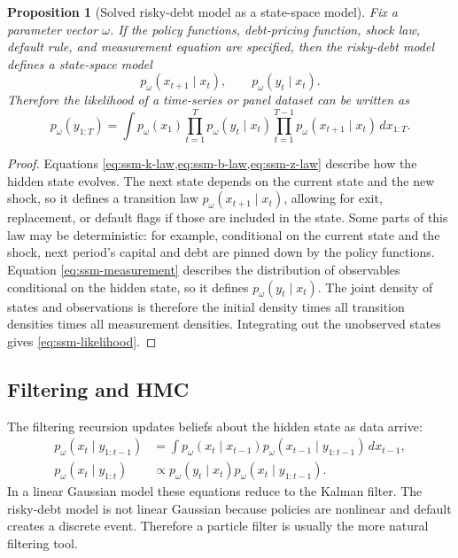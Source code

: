 \documentclass[11pt]{article}
\newtheorem{proposition}{Proposition}
\newcommand{\1}{\mathbf{1}}
\begin{document}
\begin{proposition}[Solved risky-debt model as a state-space model]
\label{prop:risky-debt-ssm}
Fix a parameter vector \(\omega\). If the policy functions, debt-pricing
function, shock law, default rule, and measurement equation are specified, then
the risky-debt model defines a state-space model
\[
  p_\omega(x_{t+1}\mid x_t),
  \qquad
  p_\omega(y_t\mid x_t).
\]
Therefore the likelihood of a time-series or panel dataset can be written as
\begin{equation}
  p_\omega(y_{1:T})
  =
  \int
  p_\omega(x_1)
  \prod_{t=1}^T
    p_\omega(y_t\mid x_t)
  \prod_{t=1}^{T-1}
    p_\omega(x_{t+1}\mid x_t)
  \,dx_{1:T}.
  \label{eq:ssm-likelihood}
\end{equation}
\end{proposition}

\begin{proof}
Equations \cref{eq:ssm-k-law,eq:ssm-b-law,eq:ssm-z-law} describe how the hidden
state evolves. The next state depends on the current state and the new shock,
so it defines a transition law \(p_\omega(x_{t+1}\mid x_t)\), allowing for
exit, replacement, or default flags if those are included in the state. Some
parts of this law may be deterministic: for example, conditional on the current
state and the shock, next period's capital and debt are pinned down by the
policy functions.
Equation \cref{eq:ssm-measurement} describes the distribution of observables
conditional on the hidden state, so it defines \(p_\omega(y_t\mid x_t)\). The
joint density of states and observations is therefore the initial density times
all transition densities times all measurement densities. Integrating out the
unobserved states gives \cref{eq:ssm-likelihood}.
\end{proof}

\subsection{Filtering and HMC}

The filtering recursion updates beliefs about the hidden state as data arrive:
\begin{align}
  p_\omega(x_t\mid y_{1:t-1})
  &=
  \int
  p_\omega(x_t\mid x_{t-1})
  p_\omega(x_{t-1}\mid y_{1:t-1})
  \,dx_{t-1}, \label{eq:ssm-predict}\\
  p_\omega(x_t\mid y_{1:t})
  &\propto
  p_\omega(y_t\mid x_t)
  p_\omega(x_t\mid y_{1:t-1}). \label{eq:ssm-update}
\end{align}
In a linear Gaussian model these equations reduce to the Kalman filter. The
risky-debt model is not linear Gaussian because policies are nonlinear and
default creates a discrete event. Therefore a particle filter is usually the
more natural filtering tool.
\end{document}
